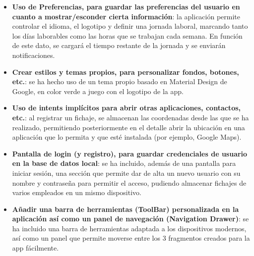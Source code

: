 \begin{itemize}
    \item \textbf{Uso de Preferencias, para guardar las preferencias del usuario en cuanto a mostrar/esconder cierta información}: la aplicación permite controlar el idioma, el logotipo y definir una jornada laboral, marcando tanto los días laborables como las horas que se trabajan cada semana. En función de este dato, se cargará el tiempo restante de la jornada y se enviarán notificaciones.
    \item \textbf{Crear estilos y temas propios, para personalizar fondos, botones, etc.}: se ha hecho uso de un tema propio basado en Material Design de Google, en color verde a juego con el logotipo de la app.
    \item \textbf{Uso de intents implícitos para abrir otras aplicaciones, contactos, etc.}: al registrar un fichaje, se almacenan las coordenadas desde las que se ha realizado, permitiendo posteriormente en el detalle abrir la ubicación en una aplicación que lo permita y que esté instalada (por ejemplo, Google Maps).
    \item \textbf{Pantalla de login (y registro), para guardar credenciales de usuario en la base de datos local}: se ha incluido, además de una pantalla para iniciar sesión, una sección que permite dar de alta un nuevo usuario con su nombre y contraseña para permitir el acceso, pudiendo almacenar fichajes de varios empleados en un mismo dispositivo.
    \item \textbf{Añadir una barra de herramientas (ToolBar) personalizada en la aplicación así como un panel de navegación (Navigation Drawer)}: se ha incluido una barra de herramientas adaptada a los dispositivos modernos, así como un panel que permite moverse entre los 3 fragmentos creados para la app fácilmente.
\end{itemize}